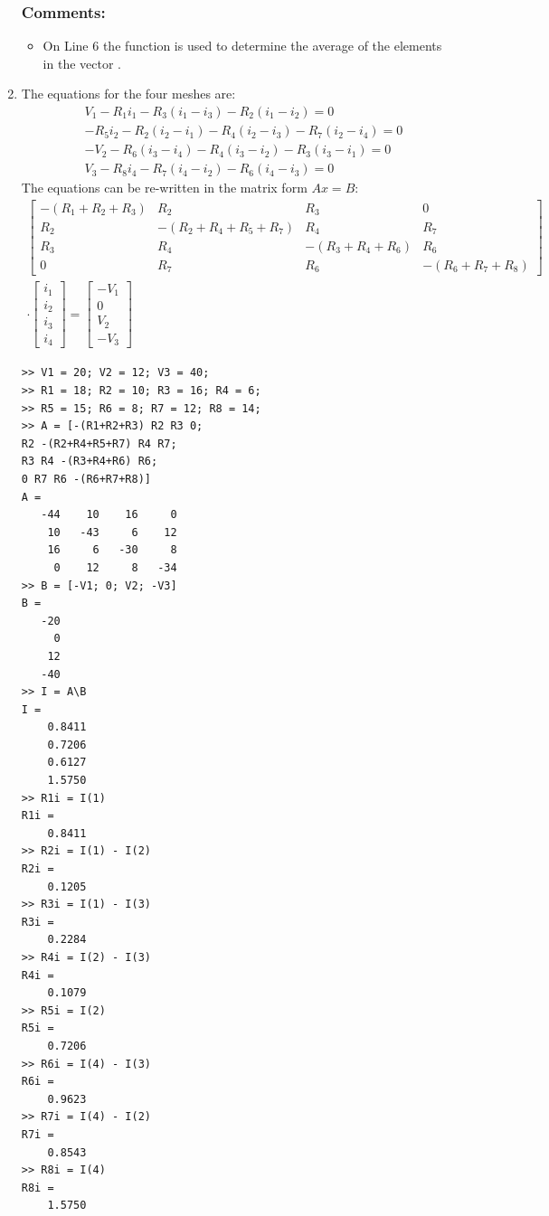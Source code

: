 \begin{enumerate}
\subsubsection{Comments:}
\begin{itemize}
\item On Line 6 the  function is used to determine the average of the elements in the vector .
\end{itemize}

\item
The equations for the four meshes are:
\begin{align*}
& V_1 - R_1 i_1 - R_3(i_1-i_3) - R_2(i_1-i_2) = 0 \\
& -R_5 i_2 - R_2(i_2-i_1) - R_4(i_2-i_3) - R_7(i_2-i_4) = 0 \\
& -V_2 - R_6(i_3-i_4) - R_4(i_3-i_2) - R_3(i_3-i_1) = 0 \\
& V_3 - R_8 i_4 - R_7(i_4-i_2) - R_6(i_4-i_3) = 0
\end{align*}
The equations can be re-written in the matrix form $Ax = B$:
\begin{equation*}
\begin{split}
\left[ \begin{array}{cccc} -(R_1 + R_2 + R_3) & R_2 & R_3 & 0 \\ R_2 & -(R_2 + R_4 + R_5 + R_7) & R_4 & R_7 \\ R_3 & R_4 & -(R_3 + R_4 + R_6) & R_6 \\ 0 & R_7 & R_6 & -(R_6 + R_7 + R_8) \end{array} \right] \\
\cdot \left[ \begin{array}{c} i_1 \\ i_2 \\ i_3 \\ i_4 \end{array} \right] = \left[ \begin{array}{c} -V_1 \\ 0 \\ V_2 \\ -V_3 \end{array} \right]
\end{split}
\end{equation*}
\begin{lstlisting}
>> V1 = 20; V2 = 12; V3 = 40;
>> R1 = 18; R2 = 10; R3 = 16; R4 = 6;
>> R5 = 15; R6 = 8; R7 = 12; R8 = 14;
>> A = [-(R1+R2+R3) R2 R3 0;
R2 -(R2+R4+R5+R7) R4 R7;
R3 R4 -(R3+R4+R6) R6;
0 R7 R6 -(R6+R7+R8)]
A =
   -44    10    16     0
    10   -43     6    12
    16     6   -30     8
     0    12     8   -34
>> B = [-V1; 0; V2; -V3]
B =
   -20
     0
    12
   -40
>> I = A\B
I =
    0.8411
    0.7206
    0.6127
    1.5750
>> R1i = I(1)
R1i =
    0.8411
>> R2i = I(1) - I(2)
R2i =
    0.1205
>> R3i = I(1) - I(3)
R3i =
    0.2284
>> R4i = I(2) - I(3)
R4i =
    0.1079
>> R5i = I(2)
R5i =
    0.7206
>> R6i = I(4) - I(3)
R6i =
    0.9623
>> R7i = I(4) - I(2)
R7i =
    0.8543
>> R8i = I(4)
R8i =
    1.5750
\end{lstlisting}

\end{enumerate}
